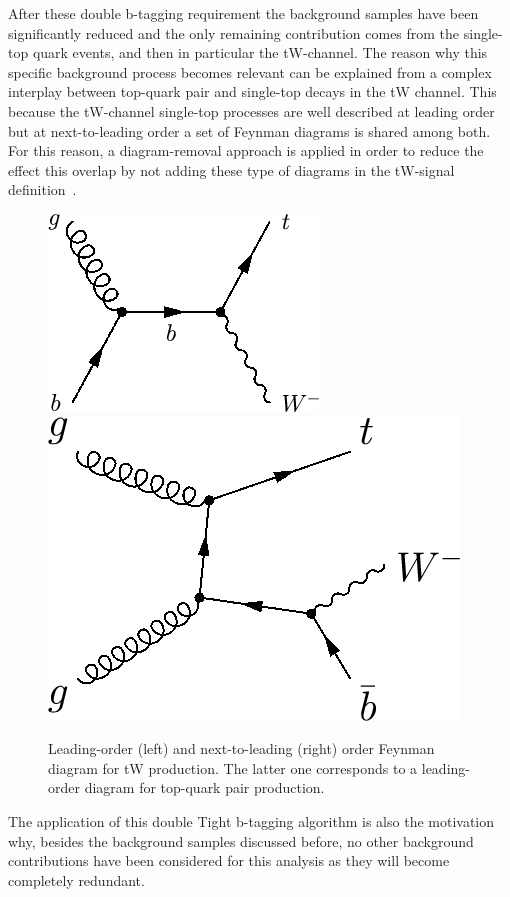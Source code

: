 After these double b-tagging requirement the background samples have been significantly reduced and the only remaining contribution comes from the single-top quark events, and then in particular the tW-channel.
The reason why this specific background process becomes relevant can be explained from a complex interplay between top-quark pair and single-top decays in the tW channel. This because the tW-channel single-top processes are well described at leading order but at next-to-leading order a set of Feynman diagrams is shared among both.
For this reason, a diagram-removal approach is applied in order to reduce the effect this overlap by not adding these type of diagrams in the tW-signal definition~\cite{DRST}.
\begin{figure}[h!t]
 \centering
 \includegraphics[width = 0.3 \textwidth]{Chapters/Chapter4_EvtSel/Figures/STtW_LO.png} \hspace{0.5cm}
 \includegraphics[width = 0.3 \textwidth]{Chapters/Chapter4_EvtSel/Figures/STtW_NLO.png}
 \caption{Leading-order (left) and next-to-leading (right) order Feynman diagram for tW production. The latter one corresponds to a leading-order diagram for top-quark pair production.} \label{fig::STtW}
\end{figure}

The application of this double Tight b-tagging algorithm is also the motivation why, besides the background samples discussed before, no other background contributions have been considered for this analysis as they will become completely redundant.

